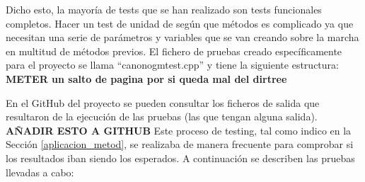 Dicho esto, la mayoría de tests que se han realizado son tests funcionales completos. Hacer un test de unidad de según que métodos es complicado ya que necesitan una serie de parámetros y variables que se van creando sobre la marcha en multitud de métodos previos. El fichero de pruebas creado específicamente para el proyecto se llama ``canonogmtest.cpp'' y tiene la siguiente estructura:
\textbf{METER un salto de pagina por si queda mal del dirtree}
\vspace{0.2cm}

En el GitHub del proyecto se pueden consultar los ficheros de salida que resultaron de la ejecución de las pruebas (las que tengan alguna salida). \textbf{AÑADIR ESTO A GITHUB}
Este proceso de testing, tal como indico en la Sección \ref{aplicacion_metod}, se realizaba de manera frecuente para comprobar si los resultados iban siendo los esperados. A continuación se describen las pruebas llevadas a cabo:

